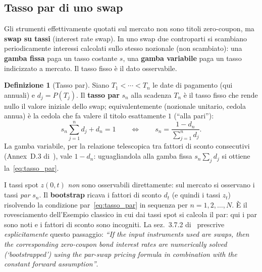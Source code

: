 \documentclass[11pt,a4paper]{article}
\theoremstyle{plain}
\theoremstyle{definition}
\newtheorem{definizione}[teorema]{Definizione}
\theoremstyle{remark}
\begin{document}
\subsection{Tasso par di uno swap}
\label{sec:par}

Gli strumenti effettivamente quotati sul mercato non sono titoli zero-coupon, ma
\textbf{swap su tassi} (interest rate swap). In uno swap due controparti si scambiano
periodicamente interessi calcolati sullo stesso nozionale (non scambiato): una \textbf{gamba
fissa} paga un tasso costante $s$, una \textbf{gamba variabile} paga un tasso indicizzato a
mercato. Il tasso fisso \`e il dato osservabile.

\begin{definizione}[Tasso par]
\label{def:par}
Siano $T_1<\cdots<T_n$ le date di pagamento (qui annuali) e $d_j=P(T_j)$. Il \textbf{tasso
par} $s_n$ alla scadenza $T_n$ \`e il tasso fisso che rende nullo il valore iniziale dello
swap; equivalentemente (nozionale unitario, cedola annua) \`e la cedola che fa valere il
titolo esattamente $1$ (``alla pari''):
\begin{equation}
  \label{eq:tasso_par}
  s_n \sum_{j=1}^{n} d_j + d_n = 1
  \qquad\Longleftrightarrow\qquad
  s_n = \frac{1 - d_n}{\displaystyle\sum_{j=1}^{n} d_j}.
\end{equation}
La gamba variabile, per la relazione telescopica tra fattori di sconto consecutivi (Annex~D.3
di~\cite{eiopa2026}), vale $1-d_n$: uguagliandola alla gamba fissa $s_n\sum_j d_j$ si ottiene
la~\eqref{eq:tasso_par}.
\end{definizione}

\begin{keybox}
I tassi spot $z(0,t)$ \emph{non} sono osservabili direttamente: sul mercato si osservano i
tassi \emph{par} $s_n$. Il \textbf{bootstrap} ricava i fattori di sconto $d_t$ (e quindi i
tassi $z_t$) risolvendo la condizione par~\eqref{eq:tasso_par} in sequenza per
$n=1,2,\ldots,N$. \`E il rovesciamento dell'Esempio classico in cui dai tassi spot si calcola
il par: qui i par sono noti e i fattori di sconto sono incogniti. La sez.~3.7.2
di~\cite{eiopa2026} prescrive \emph{esplicitamente} questo passaggio:
\emph{``If the input instruments used are swaps, then the corresponding zero-coupon bond
interest rates are numerically solved (`bootstrapped') using the par-swap pricing formula in
combination with the constant forward assumption''}.
\end{keybox}
\end{document}

